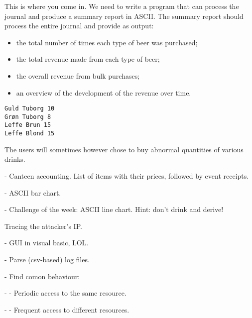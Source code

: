 This is where you come in. We need to write a program that can process the
journal and produce a summary report in ASCII. The summary report should
process the entire journal and provide as output:

\begin{itemize}

\item the total number of times each type of beer was purchased;

\item the total revenue made from each type of beer;

\item the overall revenue from bulk purchases;

\item an overview of the development of the revenue over time.

\end{itemize}

\begin{verbatim}
Guld Tuborg 10
Grøn Tuborg 8
Leffe Brun 15
Leffe Blond 15
\end{verbatim}

The users will
sometimes however chose to buy abnormal quantities of various drinks.

- Canteen accounting. List of items with their prices, followed by event
  receipts.

- ASCII bar chart.

- Challenge of the week: ASCII line chart. Hint: don't drink and derive!

Tracing the attacker's IP.

- GUI in visual basic, LOL.

- Parse (csv-based) log files.

- Find comon behaviour:

- - Periodic access to the same resource.

- - Frequent access to different resources.

